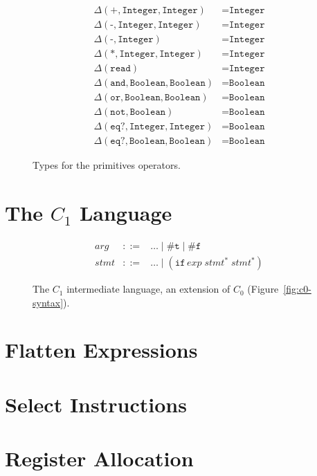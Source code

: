 \documentclass[12pt]{book}
\newcommand{\itm}[1]{\ensuremath{\mathit{#1}}}
\newcommand{\Stmt}{\itm{stmt}}
\newcommand{\Exp}{\itm{exp}}
\newcommand{\Arg}{\itm{arg}}
\newcommand{\key}[1]{\texttt{#1}}
\newcommand{\IF}[3]{(\key{if}\,#1\;#2\;#3)}
\begin{document}
\begin{figure}

\begin{align*}
\Delta(\key{+},\key{Integer},\key{Integer}) &= \key{Integer} \\
\Delta(\key{-},\key{Integer},\key{Integer}) &= \key{Integer} \\
\Delta(\key{-},\key{Integer}) &= \key{Integer} \\
\Delta(\key{*},\key{Integer},\key{Integer}) &= \key{Integer} \\
\Delta(\key{read}) &= \key{Integer} \\
\Delta(\key{and},\key{Boolean},\key{Boolean}) &= \key{Boolean} \\
\Delta(\key{or},\key{Boolean},\key{Boolean}) &= \key{Boolean} \\
\Delta(\key{not},\key{Boolean}) &= \key{Boolean} \\
\Delta(\key{eq?},\key{Integer},\key{Integer}) &= \key{Boolean} \\
\Delta(\key{eq?},\key{Boolean},\key{Boolean}) &= \key{Boolean} 
\end{align*}

\caption{Types for the primitives operators.}
\end{figure}


\section{The $C_1$ Language}

\begin{figure}[htbp]
\[
\begin{array}{lcl}
\Arg &::=& \ldots \mid \key{\#t} \mid \key{\#f} \\
\Stmt &::=& \ldots \mid \IF{\Exp}{\Stmt^{*}}{\Stmt^{*}} 
\end{array}
\]
\caption{The $C_1$ intermediate language, an extension of $C_0$
  (Figure~\ref{fig:c0-syntax}).}
\label{fig:c1-syntax}
\end{figure}

\section{Flatten Expressions}

\section{Select Instructions}

\section{Register Allocation}
\end{document}

